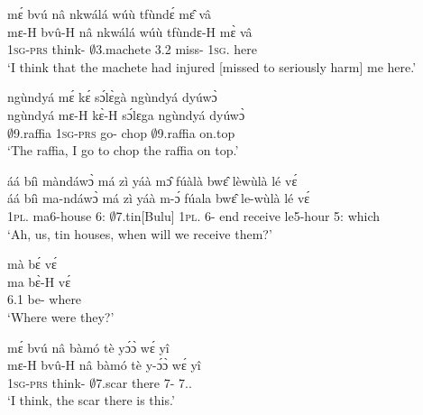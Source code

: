 \begin{exe}[(C234)]
\exC\label{17}
  \glll    mɛ́ bvú nâ nkwálá wúù tfùndɛ́ mɛ̂ vâ \\
           mɛ-H bvû-H nâ nkwálá wúù tfùndɛ-H mɛ̀ vâ \\
              1\textsc{sg}-\textsc{prs} think-{\R} {\COMP} $\emptyset$3.machete 3.{\PST}2 miss-{\R} 1\textsc{sg}.{\OBJ} here \\
    \trans `I think that the machete had injured [missed to seriously harm] me here.'
 
\exC\label{18}
  \glll    ngùndyá mɛ́ kɛ́ sɔ́lɛ̀gà ngùndyá dyúwɔ̀ \\
          ngùndyá mɛ-H kɛ̀-H sɔ́lɛga ngùndyá dyúwɔ̀ \\
              $\emptyset$9.raffia 1\textsc{sg}-\textsc{prs} go-{\R} chop $\emptyset$9.raffia on.top \\
    \trans `The raffia, I go to chop the raffia on top.'
 
\exC\label{19}
  \glll     áá bíì màndáwɔ̀ má zì yáà mɔ̂ fúàlà bwɛ̂ lèwùlà lé vɛ́\\
          áá bíì ma-ndáwɔ̀ má zì yáà m-ɔ́ fúala bwɛ̂ le-wùlà lé vɛ́\\
              {\EXCL} 1\textsc{pl}.{\OBJ} ma6-house 6:{\ATT}  $\emptyset$7.tin[Bulu] 1\textsc{pl}.{\FUT} 6-{\OBJ} end receive le5-hour 5:{\ATT}  which \\
    \trans `Ah, us, tin houses, when will we receive them?'
 
\exC\label{20}
  \glll     mà bɛ́ vɛ́ \\ 
            ma bɛ̀-H vɛ́ \\
              6.{\PST}1 be-{\R} where \\
    \trans `Where were they?'
 
\exC\label{21}
  \glll     mɛ́ bvú nâ bàmó tè yɔ́ɔ̀ wɛ́ yî \\
          mɛ-H bvû-H nâ bàmó tè y-ɔ́ɔ̀ wɛ́ yî \\
              1\textsc{sg}-\textsc{prs} think-{\R} {\COMP} $\emptyset$7.scar there 7-{\OBJ} {\ID} 7.{\DEM}.{\PROX} \\
    \trans `I think, the scar there is this.'
\end{exe}


